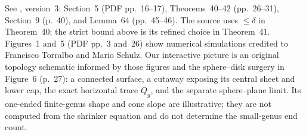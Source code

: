 \begin{example}
\begin{itemize}
\end{itemize}
See \cite{CatHMW2026}, version~3: Section~5 (PDF pp.~16--17), Theorems~40--42 (pp.~26--31), Section~9 (p.~40), and Lemma~64 (pp.~45--46). The source uses $\leq\delta$ in Theorem~40; the strict bound above is its refined choice in Theorem~41. Figures~1 and~5 (PDF pp.~3 and~26) show numerical simulations credited to Francisco Torralbo and Mario Schulz. Our interactive picture is an original topology schematic informed by those figures and the sphere--disk surgery in Figure~6 (p.~27): a connected surface, a cutaway exposing its central sheet and lower cap, the exact horizontal trace $Q_g$, and the separate sphere--plane limit. Its one-ended finite-genus shape and cone slope are illustrative; they are not computed from the shrinker equation and do not determine the small-genus end count.
\end{example}

